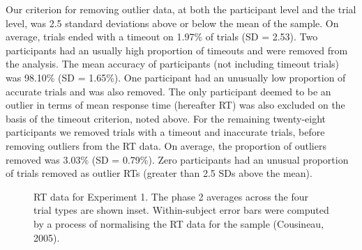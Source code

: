 \documentclass[
  man,
  floatsintext,
  longtable,
  nolmodern,
  notxfonts,
  notimes,
  colorlinks=true,linkcolor=blue,citecolor=blue,urlcolor=blue]{apa7}
\begin{document}
Our criterion for removing outlier data, at both the participant level
and the trial level, was 2.5 standard deviations above or below the mean
of the sample. On average, trials ended with a timeout on 1.97\% of
trials (SD = 2.53). Two participants had an usually high proportion of
timeouts and were removed from the analysis. The mean accuracy of
participants (not including timeout trials) was 98.10\% (SD = 1.65\%).
One participant had an unusually low proportion of accurate trials and
was also removed. The only participant deemed to be an outlier in terms
of mean response time (hereafter RT) was also excluded on the basis of
the timeout criterion, noted above. For the remaining twenty-eight
participants we removed trials with a timeout and inaccurate trials,
before removing outliers from the RT data. On average, the proportion of
outliers removed was 3.03\% (SD = 0.79\%). Zero participants had an
unusual proportion of trials removed as outlier RTs (greater than 2.5
SDs above the mean).

\begin{figure}[H]


\caption{\label{fig-RT-exp1}RT data for Experiment 1. The phase 2
averages across the four trial types are shown inset. Within-subject
error bars were computed by a process of normalising the RT data for the
sample (Cousineau, 2005).}

\end{figure}%
\end{document}
